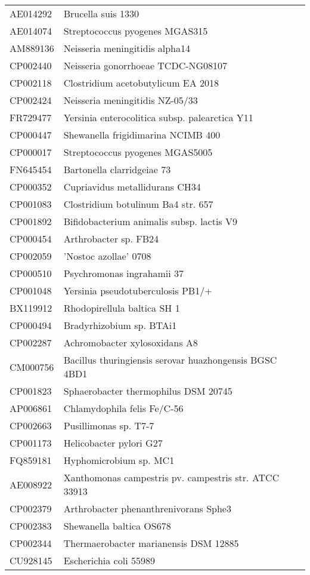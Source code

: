 \begin{longtable}{ll}
AE014292 & Brucella suis 1330\\
AE014074 & Streptococcus pyogenes MGAS315\\
AM889136 & Neisseria meningitidis alpha14\\
CP002440 & Neisseria gonorrhoeae TCDC-NG08107\\
CP002118 & Clostridium acetobutylicum EA 2018\\
CP002424 & Neisseria meningitidis NZ-05/33\\
FR729477 & Yersinia enterocolitica subsp. palearctica Y11\\
CP000447 & Shewanella frigidimarina NCIMB 400\\
CP000017 & Streptococcus pyogenes MGAS5005\\
FN645454 & Bartonella clarridgeiae 73\\
CP000352 & Cupriavidus metallidurans CH34\\
CP001083 & Clostridium botulinum Ba4 str. 657\\
CP001892 & Bifidobacterium animalis subsp. lactis V9\\
CP000454 & Arthrobacter sp. FB24\\
CP002059 & 'Nostoc azollae' 0708\\
CP000510 & Psychromonas ingrahamii 37\\
CP001048 & Yersinia pseudotuberculosis PB1/+\\
BX119912 & Rhodopirellula baltica SH 1\\
CP000494 & Bradyrhizobium sp. BTAi1\\
CP002287 & Achromobacter xylosoxidans A8\\
CM000756 & Bacillus thuringiensis serovar huazhongensis BGSC 4BD1\\
CP001823 & Sphaerobacter thermophilus DSM 20745\\
AP006861 & Chlamydophila felis Fe/C-56\\
CP002663 & Pusillimonas sp. T7-7\\
CP001173 & Helicobacter pylori G27\\
FQ859181 & Hyphomicrobium sp. MC1\\
AE008922 & Xanthomonas campestris pv. campestris str. ATCC 33913\\
CP002379 & Arthrobacter phenanthrenivorans Sphe3\\
CP002383 & Shewanella baltica OS678\\
CP002344 & Thermaerobacter marianensis DSM 12885\\
CU928145 & Escherichia coli 55989\\

\end{longtable}
